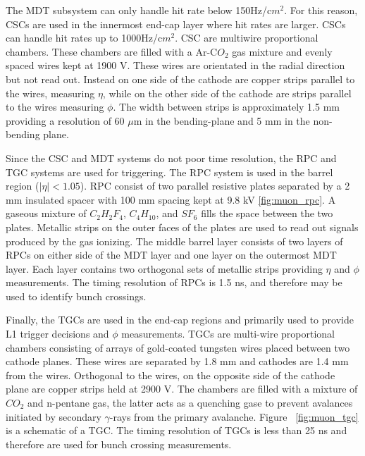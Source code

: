 The MDT subsystem can only handle hit rate below 150Hz/c$m^{2}$. For this reason, CSCs are used in the innermost end-cap layer where hit rates are larger. CSCs can handle hit rates up to 1000Hz/c$m^{2}$. CSC are multiwire proportional chambers. These chambers are filled with a Ar-C$O_{2}$ gas mixture and evenly spaced wires kept at 1900 V. These wires are orientated in the radial direction but not read out. Instead on one side of the cathode are copper strips parallel to the wires, measuring $\eta$, while on the other side of the cathode are strips parallel to the wires measuring $\phi$. The width between strips is approximately 1.5 mm providing a resolution of 60 $\mu$m in the bending-plane and 5 mm in the non-bending plane. 

Since the CSC and MDT systems do not poor time resolution, the RPC and TGC systems are used for triggering. The RPC system is used in the barrel region ($|\eta| < 1.05$). RPC consist of two parallel resistive plates separated by a 2 mm insulated spacer with 100 mm spacing kept at 9.8 kV \ref{fig:muon_rpc}. A gaseous mixture of $C_{2}H_{2}F_{4}$, $C_{4}H_{10}$, and $SF_{6}$ fills the space between the two plates. Metallic strips on the outer faces of the plates are used to read out signals produced by the gas ionizing. The middle barrel layer consists of two layers of RPCs on either side of the MDT layer and one layer on the outermost MDT layer. Each layer contains two orthogonal sets of metallic strips providing $\eta$ and $\phi$ measurements. The timing resolution of RPCs is 1.5 ns, and therefore may be used to identify bunch crossings. 

Finally, the TGCs are used in the end-cap regions and primarily used to provide L1 trigger decisions and $\phi$ measurements. TGCs are multi-wire proportional chambers consisting of arrays of gold-coated tungsten wires placed between two cathode planes. These wires are separated by 1.8 mm and cathodes are 1.4 mm from the wires. Orthogonal to the wires, on the opposite side of the cathode plane are copper strips held at 2900 V. The chambers are filled with a mixture of $CO_{2}$ and n-pentane gas, the latter acts as a quenching gase to prevent avalances initiated by secondary $\gamma$-rays from the primary avalanche. Figure ~\ref{fig:muon_tgc} is a schematic of a TGC. The timing resolution of TGCs is less than 25 ns and therefore are used for bunch crossing measurements. 

